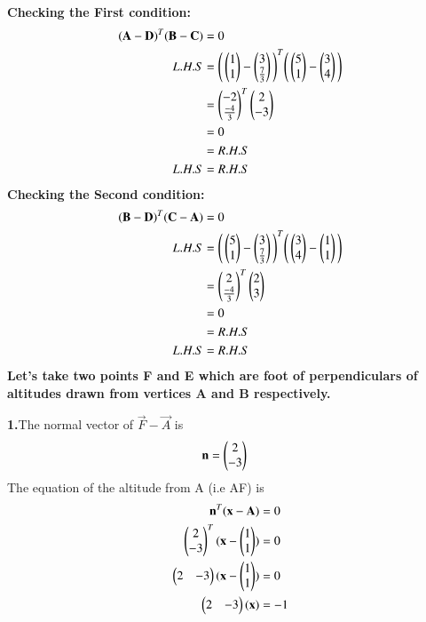 \documentclass[journal]{IEEEtran}
\begin{document}
\textbf{Checking the First condition:}
\begin{align}
(\mathbf{A}- \mathbf{D} )^{T} (\mathbf{B}- \mathbf{C})
&=0\\
L.H.S&=\Bigg(\begin{pmatrix}1\\1\end{pmatrix}- \begin{pmatrix}3\\\tfrac{7}{3}\end{pmatrix}\Bigg )^{T} \Bigg(\begin{pmatrix}5\\1\end{pmatrix}- \begin{pmatrix}3\\4\end{pmatrix}\Bigg)\\
&=\begin{pmatrix}-2\\\tfrac{-4}{3}\end{pmatrix} ^{T} \begin{pmatrix}2\\-3\end{pmatrix}\\
&=0\\
&=R.H.S\\
L.H.S&=R.H.S
\end{align}
\textbf{Checking the Second condition:}
\begin{align}
(\mathbf{B}- \mathbf{D} )^{T} (\mathbf{C}- \mathbf{A})
&=0\\
L.H.S&=\Bigg(\begin{pmatrix}5\\1\end{pmatrix}- \begin{pmatrix}3\\\tfrac{7}{3}\end{pmatrix}\Bigg )^{T} \Bigg(\begin{pmatrix}3\\4\end{pmatrix}- \begin{pmatrix}1\\1\end{pmatrix}\Bigg)\\\nonumber
&=\begin{pmatrix}2\\\tfrac{-4}{3}\end{pmatrix} ^{T} \begin{pmatrix}2\\3\end{pmatrix}\\\nonumber
&=0\\\nonumber
&=R.H.S\\
L.H.S&=R.H.S
\end{align}
\textbf{Let's take two points F and E which are foot of perpendiculars of altitudes drawn from vertices A and B respectively.}

\textbf{1.}The normal vector of    $\vec{F}-\vec{A}$ is\\ 
\begin{align}
\mathbf{n}&=\begin{pmatrix}2\\-3\end{pmatrix}
\end{align}
The equation of the altitude from A (i.e AF) is
\begin{align}
\mathbf{n}^{T}(\mathbf{x-A})&=0\\
\begin{pmatrix}2\\-3\end{pmatrix}^{T}(\mathbf{x}-\begin{pmatrix}1\\1\end{pmatrix})&=0\\
\begin{pmatrix}2&-3\end{pmatrix}(\mathbf{x}-\begin{pmatrix}1\\1\end{pmatrix})&=0\\
\begin{pmatrix}2&-3\end{pmatrix}(\mathbf{x})&=-1\\
\end{align}
\end{document}
